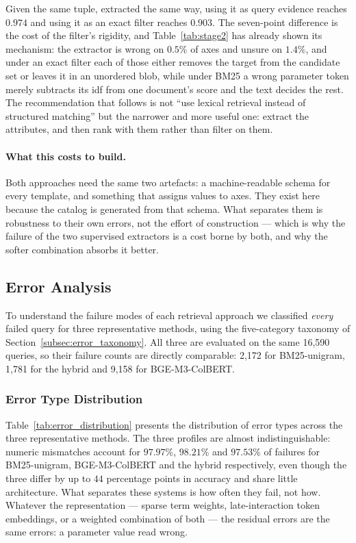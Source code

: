 \documentclass[preprint,12pt]{elsarticle}
\begin{document}
Given the same tuple, extracted the same way, using it as query evidence reaches $0.974$ and using it as an exact filter reaches $0.903$. The seven-point difference is the cost of the filter's rigidity, and Table~\ref{tab:stage2} has already shown its mechanism: the extractor is wrong on $0.5\%$ of axes and unsure on $1.4\%$, and under an exact filter each of those either removes the target from the candidate set or leaves it in an unordered blob, while under BM25 a wrong parameter token merely subtracts its idf from one document's score and the text decides the rest. The recommendation that follows is not ``use lexical retrieval instead of structured matching'' but the narrower and more useful one: extract the attributes, and then rank with them rather than filter on them.

\paragraph{What this costs to build.}
Both approaches need the same two artefacts: a machine-readable schema for every template, and something that assigns values to axes. They exist here because the catalog is generated from that schema. What separates them is robustness to their own errors, not the effort of construction --- which is why the failure of the two supervised extractors is a cost borne by both, and why the softer combination absorbs it better.

\subsection{Error Analysis}
\label{subsec:error_analysis}

To understand the failure modes of each retrieval approach we classified \emph{every} failed query for three representative methods, using the five-category taxonomy of Section~\ref{subsec:error_taxonomy}. All three are evaluated on the same 16,590 queries, so their failure counts are directly comparable: 2,172 for BM25-unigram, 1,781 for the hybrid and 9,158 for BGE-M3-ColBERT.

\subsubsection{Error Type Distribution}

Table~\ref{tab:error_distribution} presents the distribution of error types across the three representative methods. The three profiles are almost indistinguishable: numeric mismatches account for $97.97\%$, $98.21\%$ and $97.53\%$ of failures for BM25-unigram, BGE-M3-ColBERT and the hybrid respectively, even though the three differ by up to $44$ percentage points in accuracy and share little architecture. What separates these systems is how often they fail, not how. Whatever the representation --- sparse term weights, late-interaction token embeddings, or a weighted combination of both --- the residual errors are the same errors: a parameter value read wrong.
\end{document}

